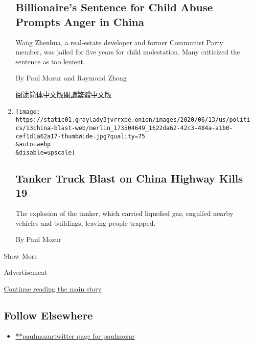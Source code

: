 \begin{enumerate}
  \hypertarget{billionaires-sentence-for-child-abuse-prompts-anger-in-china}{%
  \subsection{Billionaire's Sentence for Child Abuse Prompts Anger in
  China}\label{billionaires-sentence-for-child-abuse-prompts-anger-in-china}}

  Wang Zhenhua, a real-estate developer and former Communist Party
  member, was jailed for five years for child molestation. Many
  criticized the sentence as too lenient.

  By Paul Mozur and Raymond Zhong

  \href{https://cn.nytimes3xbfgragh.onion/china/20200618/china-wang-zhenhua-sentence/}{阅读简体中文版}\href{https://cn.nytimes3xbfgragh.onion/china/20200618/china-wang-zhenhua-sentence/z}{閱讀繁體中文版}
\item
  \href{/2020/06/13/world/asia/china-tanker-truck-explosion.html}{}

  \texttt{[image: https://static01.graylady3jvrrxbe.onion/images/2020/06/13/us/politics/13china-blast-web/merlin\_173504649\_1622da62-42c3-484a-a1b0-cef1d1a62a17-thumbWide.jpg?quality=75\\\&auto=webp\\\&disable=upscale]}

  \hypertarget{tanker-truck-blast-on-china-highway-kills-19}{%
  \subsection{Tanker Truck Blast on China Highway Kills
  19}\label{tanker-truck-blast-on-china-highway-kills-19}}

  The explosion of the tanker, which carried liquefied gas, engulfed
  nearby vehicles and buildings, leaving people trapped.

  By Paul Mozur
\end{enumerate}

Show More

Advertisement

\protect\hyperlink{after-mid2}{Continue reading the main story}

\hypertarget{follow-elsewhere}{%
\subsection{Follow Elsewhere}\label{follow-elsewhere}}

\begin{itemize}
\tightlist
\item
  \href{https://twitter.com/paulmozur}{**paulmozurtwitter page for
  paulmozur}
\end{itemize}

